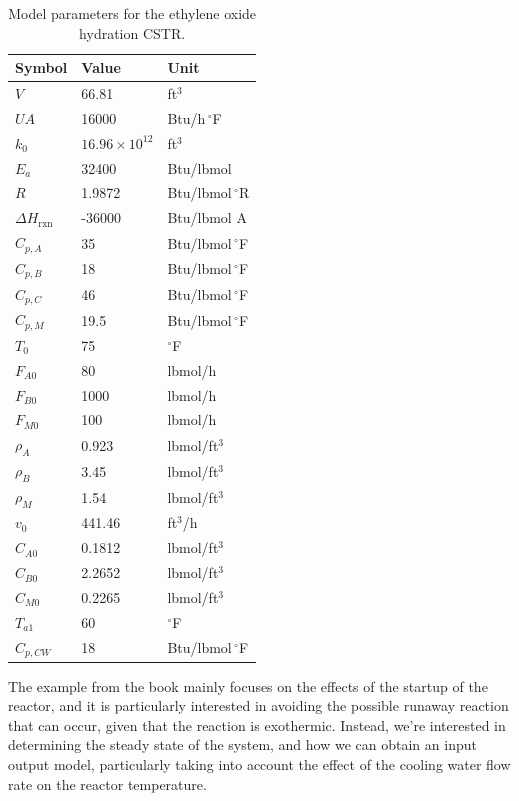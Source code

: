 \begin{table}[H]
    \centering
    \caption{Model parameters for the ethylene oxide hydration CSTR.}
    \label{tab:model_parameters}
    \begin{tabular}{lll}
        \toprule
        Symbol & Value & Unit \\
        \midrule
        $V$ & 66.81 & ft$^3$ \\
        $UA$ & 16000 & Btu/h\,$^\circ$F \\
        \midrule
        $k_0$ & $16.96 \times 10^{12}$ & ft$^{3}$ \\
        $E_a$ & 32400 & Btu/lbmol \\
        $R$ & 1.9872 & Btu/lbmol\,$^\circ$R \\
        $\Delta H_{\mathrm{rxn}}$ & -36000 & Btu/lbmol A \\
        \midrule
        $C_{p,A}$ & 35 & Btu/lbmol\,$^\circ$F \\
        $C_{p,B}$ & 18 & Btu/lbmol\,$^\circ$F \\
        $C_{p,C}$ & 46 & Btu/lbmol\,$^\circ$F \\
        $C_{p,M}$ & 19.5 & Btu/lbmol\,$^\circ$F \\
        \midrule
        $T_0$ & 75 & $^\circ$F \\
        $F_{A0}$ & 80 & lbmol/h \\
        $F_{B0}$ & 1000 & lbmol/h \\
        $F_{M0}$ & 100 & lbmol/h \\
        \midrule
        $\rho_A$ & 0.923 & lbmol/ft$^3$ \\
        $\rho_B$ & 3.45 & lbmol/ft$^3$ \\
        $\rho_M$ & 1.54 & lbmol/ft$^3$ \\
        $v_0$ & 441.46 & ft$^3$/h \\
        \midrule
        $C_{A0}$ & 0.1812 & lbmol/ft$^3$ \\
        $C_{B0}$ & 2.2652 & lbmol/ft$^3$ \\
        $C_{M0}$ & 0.2265 & lbmol/ft$^3$ \\
        \midrule
        $T_{a1}$ & 60 & $^\circ$F \\
        $C_{p,CW}$ & 18 & Btu/lbmol\,$^\circ$F \\
        \bottomrule
    \end{tabular}
\end{table}

The example from the book mainly focuses on the effects of the startup of the reactor, and it is particularly interested in avoiding the possible runaway reaction that can occur, given that the reaction is exothermic. Instead, we're interested in determining the steady state of the system, and how we can obtain an input output model, particularly taking into account the effect of the cooling water flow rate on the reactor temperature. 

